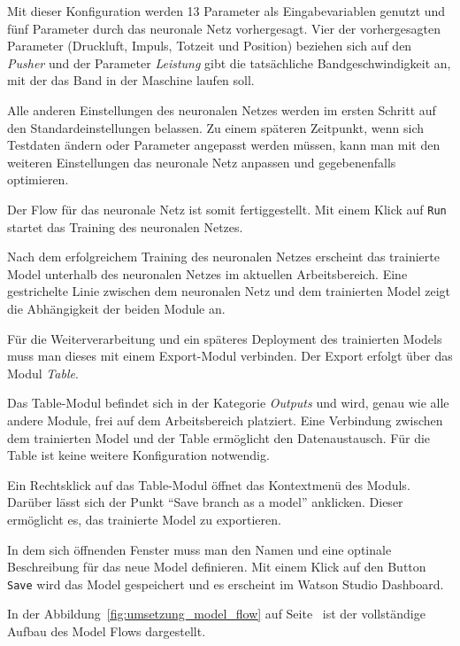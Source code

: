 Mit dieser Konfiguration werden 13 Parameter als Eingabevariablen genutzt und fünf Parameter durch das neuronale Netz
vorhergesagt. Vier der vorhergesagten Parameter (Druckluft, Impuls, Totzeit und Position) beziehen sich auf den
\textit{Pusher} und der Parameter \textit{Leistung} gibt die tatsächliche Bandgeschwindigkeit an, mit der das Band in der
Maschine laufen soll.

Alle anderen Einstellungen des neuronalen Netzes werden im ersten Schritt auf den Standardeinstellungen belassen. Zu
einem späteren Zeitpunkt, wenn sich Testdaten ändern oder Parameter angepasst werden müssen, kann man mit den weiteren
Einstellungen das neuronale Netz anpassen und gegebenenfalls optimieren.

Der Flow für das neuronale Netz ist somit fertiggestellt. Mit einem Klick auf \texttt{Run} startet das Training des
neuronalen Netzes.

Nach dem erfolgreichem Training des neuronalen Netzes erscheint das trainierte Model unterhalb des neuronalen Netzes im
aktuellen Arbeitsbereich. Eine gestrichelte Linie zwischen dem neuronalen Netz und dem trainierten Model zeigt die
Abhängigkeit der beiden Module an.

Für die Weiterverarbeitung und ein späteres Deployment des trainierten Models muss man dieses mit einem Export-Modul
verbinden. Der Export erfolgt über das Modul \textit{Table}.

Das Table-Modul befindet sich in der Kategorie \textit{Outputs} und wird, genau wie alle andere Module, frei auf dem
Arbeitsbereich platziert. Eine Verbindung zwischen dem trainierten Model und der Table ermöglicht den Datenaustausch.
Für die Table ist keine weitere Konfiguration notwendig.

Ein Rechtsklick auf das Table-Modul öffnet das Kontextmenü des Moduls. Darüber lässt sich der Punkt
\enquote{Save branch as a model} anklicken. Dieser ermöglicht es, das trainierte Model zu exportieren.

In dem sich öffnenden Fenster muss man den Namen und eine optinale Beschreibung für das neue Model definieren. Mit einem
Klick auf den Button \texttt{Save} wird das Model gespeichert und es erscheint im Watson Studio Dashboard.

In der Abbildung~\ref{fig:umsetzung_model_flow} auf Seite~\pageref{fig:umsetzung_model_flow} ist der vollständige Aufbau
des Model Flows dargestellt.

